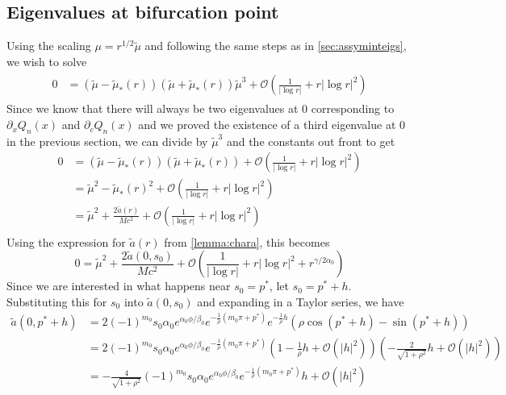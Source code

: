 \documentclass[thesis.tex]{subfiles}
\begin{document}
\subsection{Eigenvalues at bifurcation point}
Using the scaling $\mu = r^{1/2} \tilde{\mu}$ and following the same steps as in \cref{sec:assyminteigs}, we wish to solve
\begin{equation*}
\begin{aligned}
\begin{aligned}
0 &= (\tilde{\mu} - \tilde{\mu}_*(r)) (\tilde{\mu} + \tilde{\mu}_*(r))\tilde{\mu}^3 + \mathcal{O}\left( \frac{1}{|\log r|} + r |\log r|^2 \right)
\end{aligned}
\end{aligned}
\end{equation*}
Since we know that there will always be two eigenvalues at 0 corresponding to $\partial_x Q_n(x)$ and $\partial_c Q_n(x)$ and we proved the existence of a third eigenvalue at 0 in the previous section, we can divide by $\tilde{\mu}^3$ and the constants out front to get 
\begin{align*}
0 &= (\tilde{\mu} - \tilde{\mu}_*(r)) (\tilde{\mu} + \tilde{\mu}_*(r)) + \mathcal{O}\left( \frac{1}{|\log r|} + r |\log r|^2 \right) \\
&= \tilde{\mu}^2 - \tilde{\mu}_*(r)^2 + \mathcal{O}\left( \frac{1}{|\log r|} + r |\log r|^2 \right) \\
&= \tilde{\mu}^2 + \frac{2\tilde{a}(r)}{M c^2} + \mathcal{O}\left( \frac{1}{|\log r|} + r |\log r|^2 \right)\\
\end{align*}
Using the expression for $\tilde{a}(r)$ from \cref{lemma:chara}, this becomes
\begin{equation}\label{Gsymm1}
0 = \tilde{\mu}^2 + \frac{2\tilde{a}(0, s_0)}{M c^2} + \mathcal{O}\left( \frac{1}{|\log r|} + r |\log r|^2 + r^{\gamma/2\alpha_0} \right)
\end{equation}
Since we are interested in what happens near $s_0 = p^*$, let $s_0 = p^* + h$. Substituting this for $s_0$ into $\tilde{a}(0, s_0)$ and expanding in a Taylor series, we have
\begin{align*}
\tilde{a}(0, p^* + h) &= 2 (-1)^{m_0} s_0 \alpha_0 e^{\alpha_0 \phi/\beta_0} e^{-\frac{1}{\rho}(m_0 \pi + p^*) } e^{-\frac{1}{\rho}h }\left( \rho \cos(p^* + h) - \sin(p^* + h) \right) \\
&= 2 (-1)^{m_0} s_0 \alpha_0 e^{\alpha_0 \phi/\beta_0} e^{-\frac{1}{\rho}(m_0 \pi + p^*) }\left( 1 - \frac{1}{\rho}h + \mathcal{O}(|h|^2) \right) \left( -\frac{2}{\sqrt{1 + \rho^2} }h + \mathcal{O}(|h|^2) \right) \\
&= -\frac{4}{\sqrt{1 + \rho^2} }(-1)^{m_0} s_0 \alpha_0 e^{\alpha_0 \phi/\beta_0} e^{-\frac{1}{\rho}(m_0 \pi + p^*) }h + \mathcal{O}(|h|^2)
\end{align*}
\end{document}

